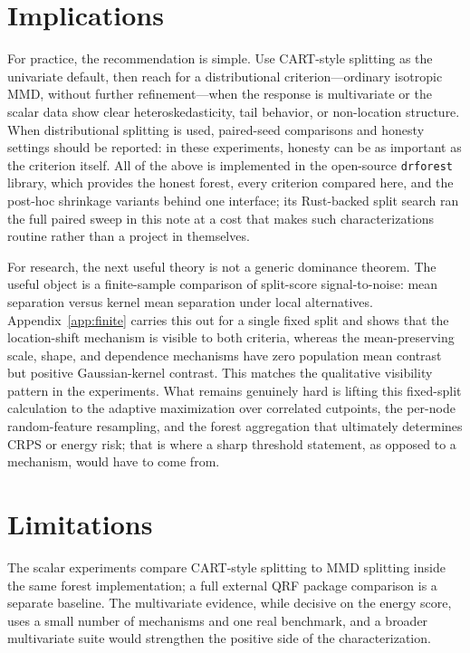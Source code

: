 \documentclass[11pt]{article}
\theoremstyle{remark}
\begin{document}
\section{Implications}

For practice, the recommendation is simple.  Use CART-style splitting as the
univariate default, then reach for a distributional criterion---ordinary
isotropic MMD, without further refinement---when the response is multivariate or
the scalar data show clear heteroskedasticity, tail behavior, or non-location
structure.  When distributional splitting is used, paired-seed comparisons and
honesty settings should be reported: in these experiments, honesty can be as
important as the criterion itself.  All of the above is implemented in the
open-source \texttt{drforest} library, which provides the honest forest, every
criterion compared here, and the post-hoc shrinkage variants behind one
interface; its Rust-backed split search ran the full paired sweep in this note
at a cost that makes such characterizations routine rather than a project in
themselves.

For research, the next useful theory is not a generic dominance theorem.  The
useful object is a finite-sample comparison of split-score signal-to-noise: mean
separation versus kernel mean separation under local alternatives.
Appendix~\ref{app:finite} carries this out for a single fixed split and shows
that the location-shift mechanism is visible to both criteria, whereas the
mean-preserving scale, shape, and dependence mechanisms have zero population
mean contrast but positive Gaussian-kernel contrast.  This matches the
qualitative visibility pattern in the experiments.  What remains genuinely hard
is lifting this fixed-split calculation to the adaptive maximization over
correlated cutpoints, the
per-node random-feature resampling, and the forest aggregation that ultimately
determines CRPS or energy risk; that is where a sharp threshold statement, as
opposed to a mechanism, would have to come from.

\section{Limitations}

The scalar experiments compare CART-style splitting to MMD splitting inside the
same forest implementation; a full external QRF package comparison is a separate
baseline.  The multivariate evidence, while decisive on the energy score, uses a
small number of mechanisms and one real benchmark, and a broader multivariate
suite would strengthen the positive side of the characterization.
\end{document}
